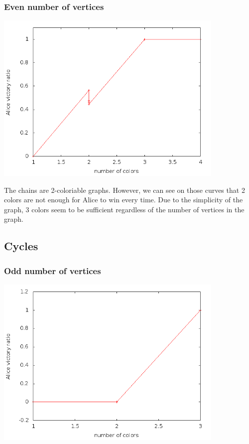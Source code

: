 \subsubsection{Even number of vertices}

\includegraphics[width=11cm]{resultats/chainepaire.png}

The chains are 2-coloriable graphs. However, we can see on those curves that 2 colors are not enough for Alice to win every time. Due to the simplicity of the graph, 3 colors seem to be sufficient regardless of the number of vertices in the graph.

\subsection{Cycles}

\subsubsection{Odd number of vertices}

\includegraphics[width=11cm]{resultats/cycleimpair.png}

